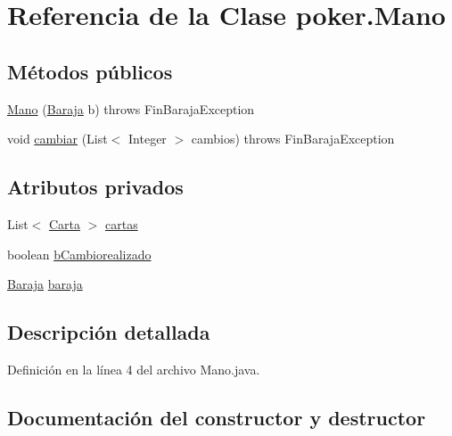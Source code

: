 \hypertarget{classpoker_1_1Mano}{}\section{Referencia de la Clase poker.\+Mano}
\label{classpoker_1_1Mano}
\subsection*{Métodos públicos}
\begin{DoxyCompactItemize}
\item 
\mbox{\hyperlink{classpoker_1_1Mano_ac89468d484812da476c2a46201eb513e}{Mano}} (\mbox{\hyperlink{classpoker_1_1Baraja}{Baraja}} b)  throws Fin\+Baraja\+Exception
\item 
void \mbox{\hyperlink{classpoker_1_1Mano_a1f3e7289b85d98324d46a8afce171368}{cambiar}} (List$<$ Integer $>$ cambios)  throws Fin\+Baraja\+Exception
\end{DoxyCompactItemize}
\subsection*{Atributos privados}
\begin{DoxyCompactItemize}
\item 
List$<$ \mbox{\hyperlink{classpoker_1_1Carta}{Carta}} $>$ \mbox{\hyperlink{classpoker_1_1Mano_ae6e107ad79d163a4c45afc6274d36d9e}{cartas}}
\item 
boolean \mbox{\hyperlink{classpoker_1_1Mano_ac3ccca1fe77bcb279ad4f0b7547b643d}{b\+Cambiorealizado}}
\item 
\mbox{\hyperlink{classpoker_1_1Baraja}{Baraja}} \mbox{\hyperlink{classpoker_1_1Mano_a9fd3c2334c2346b20e9e881b370fb564}{baraja}}
\end{DoxyCompactItemize}


\subsection{Descripción detallada}


Definición en la línea 4 del archivo Mano.\+java.



\subsection{Documentación del constructor y destructor}
\mbox{\label{classpoker_1_1Mano_ac89468d484812da476c2a46201eb513e}} 
